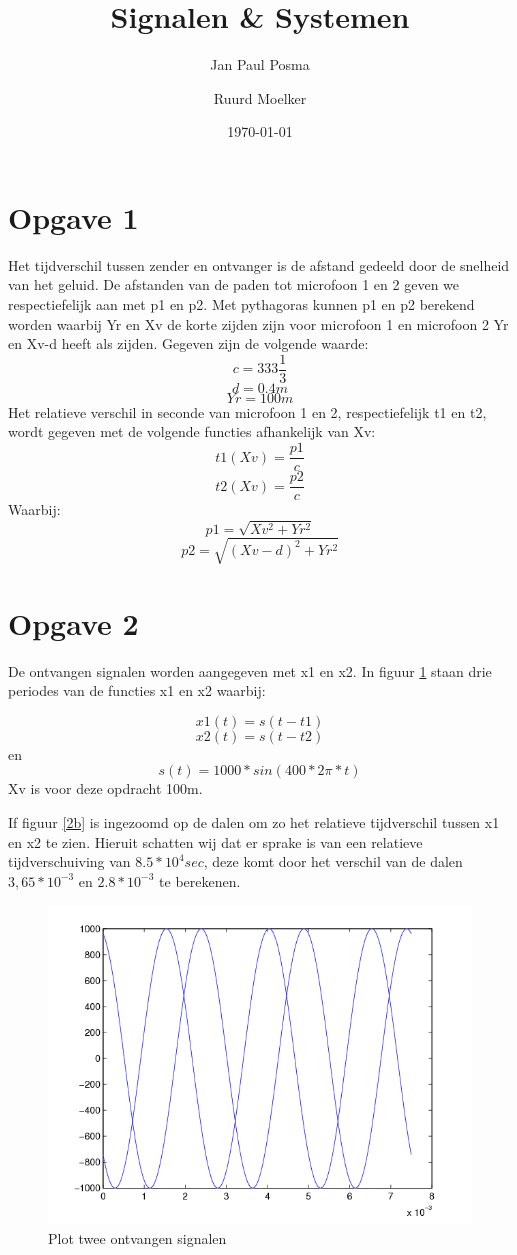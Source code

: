 \documentclass{article}
\author{Jan Paul Posma \and Ruurd Moelker}
\date{\today}
\title{Signalen \& Systemen}
\begin{document}
\maketitle 

\section{Opgave 1}
Het tijdverschil tussen zender en ontvanger is de afstand gedeeld door de snelheid van het geluid. De afstanden van de paden tot microfoon 1 en 2 geven we respectiefelijk aan met p1 en p2. Met pythagoras kunnen p1 en p2 berekend worden waarbij Yr en Xv de korte zijden zijn voor microfoon 1 en microfoon 2 Yr en Xv-d heeft als zijden. Gegeven zijn de volgende waarde:
$$c = 333\frac{1}{3}$$ $$d = 0.4m$$ $$Yr = 100m$$
Het relatieve verschil in seconde van microfoon 1 en 2, respectiefelijk t1 en t2, wordt gegeven met de volgende functies afhankelijk van Xv:
$$t1(Xv) = \frac{p1}{c}$$ $$t2(Xv) = \frac{p2}{c}$$
Waarbij:
$$p1 = \sqrt{Xv^2 + Yr^2}$$ $$p2 = \sqrt{(Xv-d)^2 + Yr^2}$$ 

\section{Opgave 2}
De ontvangen signalen worden aangegeven met x1 en x2. In figuur \ref{2a} staan drie periodes van de functies x1 en x2 waarbij:

$$x1(t) = s(t - t1)$$ $$x2(t) = s(t - t2)$$ en $$s(t) = 1000*sin(400*2\pi*t)$$
Xv is voor deze opdracht 100m.

If figuur \ref{2b} is ingezoomd op de dalen om zo het relatieve tijdverschil tussen x1 en x2 te zien. Hieruit schatten wij dat er sprake is van een relatieve tijdverschuiving van \begin{math}8.5*10^4 sec\end{math}, deze komt door het verschil van de dalen $3,65*10^{-3}$ en $2.8*10^{-3}$ te berekenen.

\begin{figure}
	\begin{center}
	\includegraphics{2a.png}
	\caption{Plot twee ontvangen signalen}
	\end{center}
 \label{2a}
\end{figure}
\end{document}
